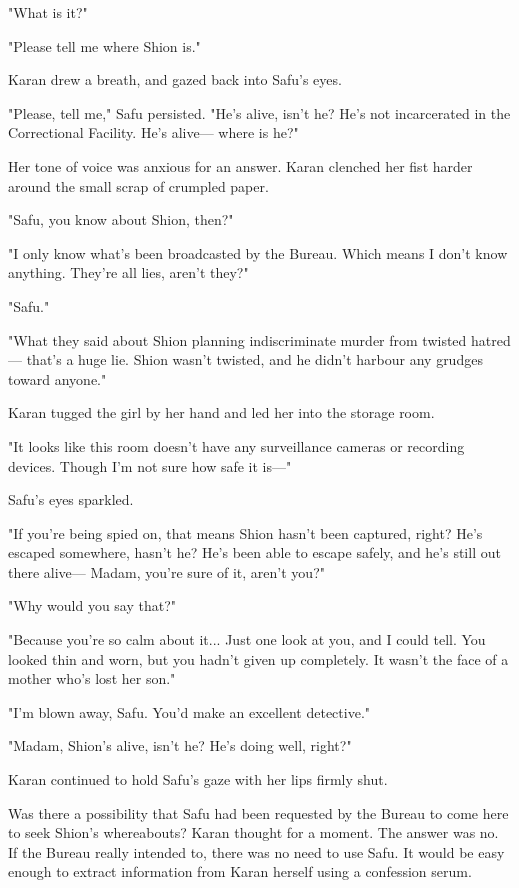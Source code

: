 "What is it?"

"Please tell me where Shion is."

Karan drew a breath, and gazed back into Safu's eyes.

"Please, tell me," Safu persisted. "He's alive, isn't he? He's not
incarcerated in the Correctional Facility. He's alive--- where is he?"

Her tone of voice was anxious for an answer. Karan clenched her fist
harder around the small scrap of crumpled paper.

"Safu, you know about Shion, then?"

"I only know what's been broadcasted by the Bureau. Which means I don't
know anything. They're all lies, aren't they?"

"Safu."

"What they said about Shion planning indiscriminate murder from twisted
hatred--- that's a huge lie. Shion wasn't twisted, and he didn't harbour
any grudges toward anyone."

Karan tugged the girl by her hand and led her into the storage room.

"It looks like this room doesn't have any surveillance cameras or
recording devices. Though I'm not sure how safe it is---"

Safu's eyes sparkled.

"If you're being spied on, that means Shion hasn't been captured, right?
He's escaped somewhere, hasn't he? He's been able to escape safely, and
he's still out there alive--- Madam, you're sure of it, aren't you?"

"Why would you say that?"

"Because you're so calm about it... Just one look at you, and I could
tell. You looked thin and worn, but you hadn't given up completely. It
wasn't the face of a mother who's lost her son."

"I'm blown away, Safu. You'd make an excellent detective."

"Madam, Shion's alive, isn't he? He's doing well, right?"

Karan continued to hold Safu's gaze with her lips firmly shut.

Was there a possibility that Safu had been requested by the Bureau to
come here to seek Shion's whereabouts? Karan thought for a moment. The
answer was no. If the Bureau really intended to, there was no need to
use Safu. It would be easy enough to extract information from Karan
herself using a confession serum.

